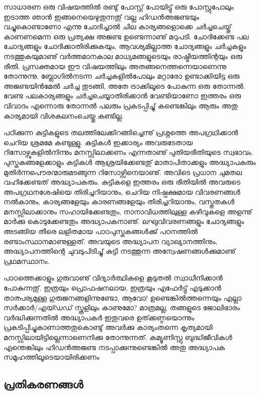 ﻿
\vskip 2pt

സാധാരണ ഒരു വിഷയത്തില്‍ രണ്ടു് പോസ്റ്റ് പോയിട്ടു് ഒരു പോസ്റ്റുപോലും ഇടാത്ത ഞാന്‍ ഇങ്ങനെയെഴുതുന്നതു് 
വല്ല ഹിഡന്‍അജണ്ടയും വച്ചുകൊണ്ടാണോ എന്നു ചോദിച്ചാല്‍ ചില കാര്യങ്ങളൊക്കെ ചര്‍ച്ചചെയ്തു് കാണണമെന്ന 
ഒരു പ്രത്യക്ഷ അജണ്ട ഉണ്ടെന്നാണു് മറുപടി. ചോദിക്കേണ്ട പല ചോദ്യങ്ങളും ചോദിക്കാതിരിക്കുകയും, ആവശ്യമില്ലാത്ത 
ചോദ്യങ്ങളും ചര്‍ച്ചകളും നടത്തുകയുമാണു് വര്‍ത്തമാനകാല മാധ്യമങ്ങളുടെയും രാഷ്ട്രീയത്തിന്റയും ഒരു രീതി. 
പ്രസക്തമായ ഈ വിഷയത്തിലും അതങ്ങനെത്തന്നെയാണെന്നു തോന്നുന്നു. ബ്ലോഗില്‍നടന്ന ചര്‍ച്ചകളില്‍പോലും 
മറ്റാരോ ഉണ്ടാക്കിയിട്ട ഒരു അജണ്ടയിന്‍മേല്‍ ചര്‍ച്ച തുടങ്ങി, അതേ ട്രാക്കിലൂടെ പോകുന്ന ഒരു തോന്നല്‍. വേണ്ട 
പലകാര്യങ്ങളും ചര്‍ച്ചചെയ്യാതിരിക്കാന്‍ വേണ്ടിയാണോ ഇത്തരം ഒരു വിവാദം എന്നൊരു തോന്നല്‍ പലരും 
പ്രകടപ്പിച്ചു് കണ്ടെങ്കിലും ആരും അതു കാര്യമായി വിശകലനംചെയ്തു കണ്ടില്ല.

പഠിക്കുന്ന കുട്ടികളുടെ തലത്തിലേക്കിറങ്ങിച്ചെന്നു് പ്രശ്നത്തെ അപഗ്രഥിക്കാന്‍ ചെറിയ ശ്രമമേ കണ്ടുള്ളു. കുട്ടികള്‍ 
ഇക്കാര്യം അവരുടേതായ റിസോഴ്സുകളില്‍നിന്നും മനസ്സിലാക്കണം എന്നതാണു് പുതിയരീതിയുടെ സ്വഭാവം. 
പുസ്തകങ്ങളേക്കാളും കുട്ടികള്‍ ആശ്രയിക്കേണ്ടതു് മാതാപിതാക്കളും അദ്ധ്യാപകരും മുതിര്‍ന്നപൌരന്മാരുമടങ്ങുന്ന 
റിസോഴ്സിനെയാണു്. അവിടെ പ്രധാന ചുമതല വഹിക്കേണ്ടത് അദ്ധ്യാപകരും. കുട്ടികളെ ഇത്തരം ഒരു രീതിയില്‍ 
അവരുടെ അപഗ്രഥനശേഷിയെ തിരിച്ചറിയാനും, ചെറിയ നിഷ്പക്ഷമായ വിവരണങ്ങള്‍ നല്‍കാനും, 
കാര്യങ്ങളേയും കാരണങ്ങളേയും തിരിച്ചറിയാനും, വസ്തുതകള്‍ മനസ്സിലാക്കാനും സഹായിക്കേണ്ടതും, നാനാവിധത്തിലുള്ള 
കഴിവുകളെ അളന്നു് മാര്‍ക്കു കൊടുക്കേണ്ടതും അദ്ധ്യാപകനാണു്. ലഘുവിവരണങ്ങളും ചോദ്യങ്ങളും അടങ്ങിയ തീരെ 
ലളിതമായ പാഠപുസ്തകങ്ങള്‍ക്കു് പഠനത്തില്‍ രണ്ടാംസ്ഥാനമാണുള്ളത്. അവയുടെ അദ്ധ്യാപന വ്യാഖ്യാനത്തിനും, 
അദ്ധ്യാപനത്തിന്റെ ചുവടുപിടിച്ചു് കുട്ടി നടത്തുന്ന അന്വേഷണങ്ങള്‍ക്കുമാണു് പ്രഥമസ്ഥാനം.

പാഠത്തെക്കാളും ഗുരുവാണു് വിദ്യാര്‍ത്ഥികളെ കൂടുതല്‍ സ്വാധീനിക്കാന്‍ പോകുന്നതു്. ഇത്രയും പ്രൊഫഷനലായ, 
ഇത്രയും എഫേര്‍ട്ടു് എടുക്കാന്‍ താത്പര്യമുള്ള ഗുരുജനങ്ങളിന്നുണ്ടോ, ആവോ! ഉണ്ടെങ്കില്‍ത്തന്നെയും എല്ലാ 
സര്‍ക്കാര്‍/എയ്ഡഡ് സ്കൂളിലും കാണുമോ? മാത്രമല്ല, തങ്ങളുടെ ജോലിഭാരം വര്‍ദ്ധിക്കുന്നതില്‍ അദ്ധ്യാപകര്‍ 
ഇതുവരെ ഉത്ക്കണ്ഠയൊന്നും പ്രകടിപ്പിച്ചുകാണാത്തതുകൊണ്ടു് അവര്‍ക്കു കാര്യംതന്നെ കൃത്യമായി 
മനസ്സിലായിട്ടില്ലെന്നാണെനിക്കു തോന്നുന്നത്. കമ്യൂണിസ്റ്റു ബുദ്ധിജീവികള്‍ എന്തെങ്കിലും ഹിഡന്‍അജണ്ട 
നടപ്പാക്കുന്നുണ്ടെങ്കില്‍ അതു അദ്ധ്യാപക സമൂഹത്തിലൂടെയായിരിക്കണം

\subsection*{പ്രതികരണങ്ങള്‍}

